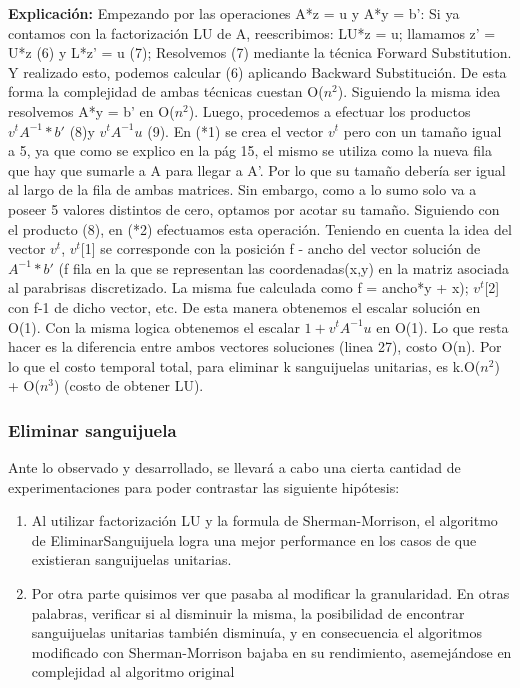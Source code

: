  \textbf{Explicación:}\newline  
Empezando por las operaciones A*z = u y A*y = b': \newline
Si ya contamos con la factorización LU de A, reescribimos:\newline
LU*z = u; \newline
llamamos z' = U*z (6) y L*z' = u (7);\newline
Resolvemos (7) mediante la técnica Forward Substitution. Y realizado esto, podemos calcular (6) aplicando Backward Substitución. De esta forma la complejidad de ambas técnicas cuestan O($n^2$). Siguiendo la misma idea resolvemos 
A*y = b' en O($n^2$). Luego, procedemos a efectuar los productos $v^t A^{-1}*b'$ (8)y $v^t A^{-1}u$ (9). En (*1) se crea el vector $v^t$ pero con un tamaño igual a 5, ya que como se explico en la pág 15, el mismo  se utiliza como la nueva fila que hay que sumarle a A para llegar a A'. Por lo que su tamaño debería ser igual al largo de la fila de ambas matrices. Sin embargo, como a lo sumo solo va a poseer 5 valores distintos de cero, optamos por acotar su tamaño. Siguiendo con el producto (8), en (*2) efectuamos esta operación. Teniendo en cuenta la idea del vector $v^t$, $v^t$[1] se corresponde con la posición f - ancho del vector solución de $A^{-1}*b'$ (f fila en la que se representan las coordenadas(x,y) en la matriz asociada al parabrisas discretizado. La misma fue calculada como f = ancho*y + x); $v^t$[2] con f-1 de dicho vector, etc. De esta manera obtenemos el escalar solución en O(1). Con la misma logica obtenemos el escalar $1+v^t A^{-1}u$ en O(1). Lo que resta hacer es la diferencia entre ambos vectores soluciones (linea 27), costo O(n). Por lo que el costo temporal total, para eliminar k sanguijuelas unitarias, es k.O($n^2$) + O($n^3$) (costo de obtener LU).\newline\newline






\subsubsection{Eliminar sanguijuela}
Ante lo observado y desarrollado, se llevará a cabo una cierta cantidad de experimentaciones para poder contrastar las siguiente  hipótesis:\\

\begin{enumerate}
\item Al utilizar factorización LU y la formula de Sherman-Morrison, el algoritmo de EliminarSanguijuela logra una mejor performance en los casos de que existieran sanguijuelas unitarias.
\item Por otra parte quisimos ver que pasaba al modificar la granularidad. En otras palabras, verificar si al disminuir la misma, la posibilidad de encontrar sanguijuelas unitarias también disminuía, y en consecuencia el algoritmos modificado con Sherman-Morrison bajaba en su rendimiento, asemejándose en complejidad al algoritmo original\\
\end{enumerate}


